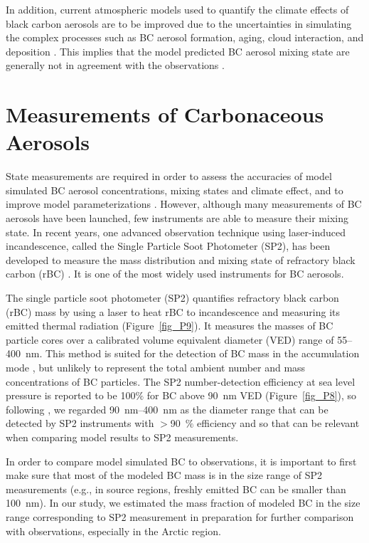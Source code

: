 \documentclass[12pt, fullpage]{uiucthesis2009}
\begin{document}
	In addition, current atmospheric models used to quantify the climate effects of black carbon aerosols are to be improved due to the uncertainties in simulating the complex processes such as BC aerosol formation, aging, cloud interaction, and deposition \citep{Kipling2016}. This implies that the model predicted BC aerosol mixing state are generally not in agreement with the observations \citep{Raatikainen2015}. 
	
	\section{Measurements of Carbonaceous Aerosols}
	State measurements are required in order to assess the accuracies of model simulated BC aerosol concentrations, mixing states and climate effect, and to improve model parameterizations \citep[e.g.][]{Reddington2013}. However, although many measurements of BC aerosols have been launched, few instruments are able to measure their mixing state. In recent years, one advanced observation technique using laser-induced incandescence, called the Single Particle Soot Photometer (SP2), has been developed to measure the mass distribution and mixing state of refractory black carbon (rBC) \citep[][]{baumgardner2004warming,schulz2006radiative}. It is one of the most widely used instruments for BC aerosols. 
	
	The single particle soot photometer (SP2) quantifies refractory black carbon (rBC) mass by using a laser to heat rBC to incandescence and measuring its emitted thermal radiation (Figure~\ref{fig_P9}). It measures the masses of BC particle cores over a calibrated volume equivalent diameter (VED) range of 55--400~nm. This method is suited for the detection of BC mass in the accumulation mode \citep{schwarz2010global}, but unlikely to represent the total ambient number and mass concentrations of BC particles. The SP2 number-detection efficiency at sea level pressure is reported to be 100$\%$ for BC above 90~nm VED \citep{schwarz2010global} (Figure~\ref{fig_P8}), so following \citet{Reddington2013}, we regarded 90~nm--400~nm as the diameter range that can be detected by SP2 instruments with $>$90~$\%$ efficiency and so that can be relevant when comparing model results to SP2 measurements.
	
	In order to compare model simulated BC to observations, it is important to first make sure that most of the modeled BC mass is in the size range of SP2 measurements (e.g., in source regions, freshly emitted BC can be smaller than 100~nm). In our study, we estimated the mass fraction of modeled BC in the size range corresponding to SP2 measurement in preparation for further comparison with observations, especially in the Arctic region.
	
\end{document}
